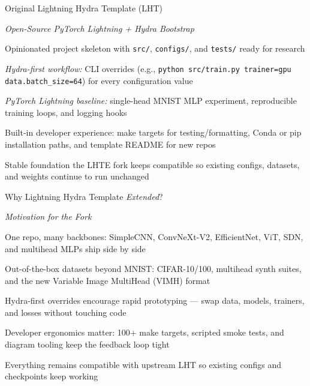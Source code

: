 \begin{slide}[\slideopts,toc={Original LHT}]{Original Lightning Hydra Template (LHT)}

  \emph{Open-Source PyTorch Lightning + Hydra Bootstrap}

  \begin{itemize}
    \mpitem Opinionated project skeleton with \texttt{src/}, \texttt{configs/}, and \texttt{tests/} ready for research

    \mpitem \emph{Hydra-first workflow:} CLI overrides (e.g., \texttt{python src/train.py trainer=gpu data.batch\_size=64}) for every configuration value

    \mpitem \emph{PyTorch Lightning baseline:} single-head MNIST MLP experiment, reproducible training loops, and logging hooks

    \mpitem Built-in developer experience: make targets for testing/formatting, Conda or pip installation paths, and template README for new repos

    \mpitem Stable foundation the LHTE fork keeps compatible so existing configs, datasets, and weights continue to run unchanged
  \end{itemize}

\end{slide}

\begin{slide}[\slideopts,toc={Why LHTE}]{Why Lightning Hydra Template \emph{Extended}?}

  \emph{Motivation for the Fork}

  \begin{itemize}
    \mpitem One repo, many backbones: SimpleCNN, ConvNeXt-V2, EfficientNet, ViT, SDN, and multihead MLPs ship side by side

    \mpitem Out-of-the-box datasets beyond MNIST: CIFAR-10/100, multihead synth suites, and the new Variable Image MultiHead (VIMH) format

    \mpitem Hydra-first overrides encourage rapid prototyping --- swap data, models, trainers, and losses without touching code

    \mpitem Developer ergonomics matter: 100+ make targets, scripted smoke tests, and diagram tooling keep the feedback loop tight

    \mpitem Everything remains compatible with upstream LHT so existing configs and checkpoints keep working
  \end{itemize}

\end{slide}

